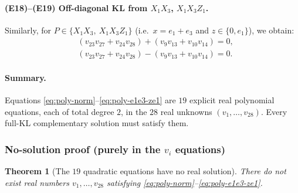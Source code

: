\documentclass[11pt]{article}
\newtheorem{theorem}{Theorem}
\begin{document}
\paragraph{(E18)--(E19) Off-diagonal KL from $X_1X_3$, $X_1X_3Z_1$.}
Similarly, for $P\in\{X_1X_3,\ X_1X_3Z_1\}$ (i.e.\ $x=e_1+e_3$ and $z\in\{0,e_1\}$),
we obtain:
\begin{align}
\label{eq:poly-e1e3-z0}
&(v_{23}v_{27}+v_{24}v_{28})+(v_{9}v_{13}+v_{10}v_{14})=0,\tag{E18}\\
\label{eq:poly-e1e3-ze1}
&(v_{23}v_{27}+v_{24}v_{28})-(v_{9}v_{13}+v_{10}v_{14})=0.\tag{E19}
\end{align}

\paragraph{Summary.}
Equations \eqref{eq:poly-norm}--\eqref{eq:poly-e1e3-ze1} are $19$ explicit real polynomial equations,
each of total degree $2$, in the $28$ real unknowns $(v_1,\dots,v_{28})$.
Every full-KL complementary solution must satisfy them.

\subsubsection*{No-solution proof (purely in the $v_i$ equations)}

\begin{theorem}[The $19$ quadratic equations have no real solution]
\label{thm:no-solution-19eq}
There do not exist real numbers $v_1,\dots,v_{28}$ satisfying
\eqref{eq:poly-norm}--\eqref{eq:poly-e1e3-ze1}.
\end{theorem}
\end{document}

